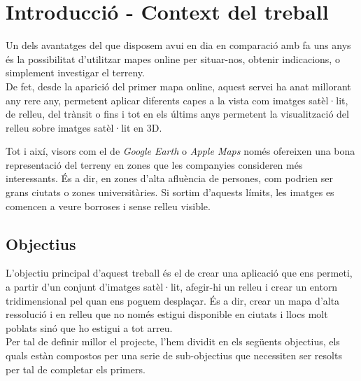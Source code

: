 ﻿\documentclass[10pt,a4paper,twocolumn,twoside]{article}
\newcommand\blfootnote[1]{%
  \begingroup
  \renewcommand\thefootnote{}\footnote{#1}%
  \addtocounter{footnote}{-1}%
  \endgroup
}
\begin{document}

\section{Introducció - Context del treball}

Un dels avantatges del que disposem avui en dia en comparació amb fa uns anys és la possibilitat d'utilitzar mapes online per situar-nos, obtenir indicacions, o simplement investigar el terreny.\\

De fet, desde la aparició del primer mapa online, aquest servei ha anat millorant any rere any, permetent aplicar diferents capes a la vista com imatges satèl·lit, de relleu, del trànsit o fins i tot en els últims anys permetent la visualització del relleu sobre imatges satèl·lit en 3D.

Tot i així, visors com el de \textit{Google Earth} o \textit{Apple Maps} només ofereixen una bona representació del terreny en zones que les companyies consideren més interessants. És a dir, en zones d'alta afluència de persones, com podrien ser grans ciutats o zones universitàries. Si sortim d'aquests límits, les imatges es comencen a veure borroses i sense relleu visible.


\subsection{Objectius}
L'objectiu principal d'aquest treball és el de crear una aplicació que ens permeti, a partir d'un conjunt d'imatges satèl·lit, afegir-hi un relleu i crear un entorn tridimensional pel quan ens poguem desplaçar. És a dir, crear un mapa d'alta ressolució i en relleu que no només estigui disponible en ciutats i llocs molt poblats sinó que ho estigui a tot arreu.\\
Per tal de definir millor el projecte, l'hem dividit en els següents objectius, els quals estàn compostos per una serie de sub-objectius que necessiten ser resolts per tal de completar els primers.\\
\end{document}
